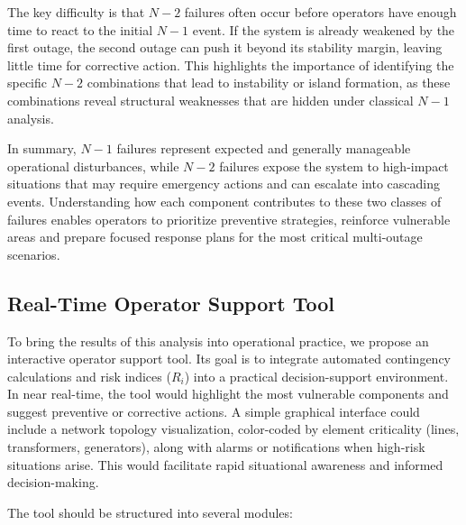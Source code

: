 \documentclass[journal]{IEEEtran}
\begin{document}
The key difficulty is that $N-2$ failures often occur before operators have enough time to react to the initial $N-1$ event. If the system is already weakened by the first outage, the second outage can push it beyond its stability margin, leaving little time for corrective action. This highlights the importance of identifying the specific $N-2$ combinations that lead to instability or island formation, as these combinations reveal structural weaknesses that are hidden under classical $N-1$ analysis.

In summary, $N-1$ failures represent expected and generally manageable operational disturbances, while $N-2$ failures expose the system to high-impact situations that may require emergency actions and can escalate into cascading events. Understanding how each component contributes to these two classes of failures enables operators to prioritize preventive strategies, reinforce vulnerable areas and prepare focused response plans for the most critical multi-outage scenarios.

\subsection{Real-Time Operator Support Tool}

To bring the results of this analysis into operational practice, we propose an interactive operator support tool. Its goal is to integrate automated contingency calculations and risk indices ($R_i$) into a practical decision-support environment. In near real-time, the tool would highlight the most vulnerable components and suggest preventive or corrective actions. A simple graphical interface could include a network topology visualization, color-coded by element criticality (lines, transformers, generators), along with alarms or notifications when high-risk situations arise. This would facilitate rapid situational awareness and informed decision-making.

The tool should be structured into several modules:
\end{document}
